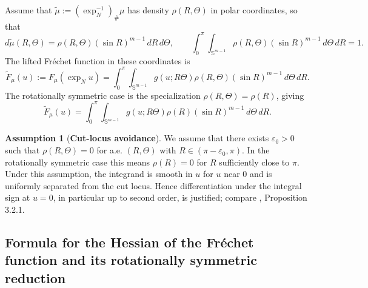 \documentclass{amsart}
\theoremstyle{definition}
\newtheorem{assumption}[theorem]{Assumption}
\theoremstyle{remark}
\newcommand\0{\boldsymbol{0}}
\begin{document}
Assume that \(\widetilde\mu:=(\exp_N^{-1})_\#\mu\) has density \(\rho(R,\Theta)\) in polar coordinates, so that
\begin{equation}
\label{eqn:general-density-polar}
    d\widetilde\mu(R,\Theta)=\rho(R,\Theta)(\sin R)^{m-1}\,dR\,d\Theta,
    \qquad
    \int_0^\pi\!\!\int_{\mathbb S^{m-1}}\rho(R,\Theta)(\sin R)^{m-1}\,d\Theta\,dR=1 .
\end{equation}
The lifted Fr\'echet function in these coordinates is
\begin{equation}\label{eqn:Frechet-general-polar}
    \widetilde F_\mu(u):=F_\mu(\exp_Nu)
    =
    \int_0^\pi\!\!\int_{\mathbb S^{m-1}}
    g(u;R\Theta)\rho(R,\Theta)(\sin R)^{m-1}\,d\Theta\,dR .
\end{equation}
The rotationally symmetric case is the specialization \(\rho(R,\Theta)=\rho(R)\), giving
\begin{equation}
\label{eqn:Fréchet-rot-symm-double-int}
    \widetilde F_\mu(u)
    =
    \int_0^\pi\!\!\int_{\mathbb S^{m-1}}
    g(u;R\Theta)\rho(R)(\sin R)^{m-1}\,d\Theta\,dR .
\end{equation}

\begin{assumption}[\textbf{Cut-locus avoidance}]
\label{assum:density-assumption}
We assume that there exists \(\varepsilon_0>0\) such that \(\rho(R,\Theta)=0\) for a.e. \((R,\Theta)\) with \(R\in(\pi-\varepsilon_0,\pi)\).  In the rotationally symmetric case this means \(\rho(R)=0\) for \(R\) sufficiently close to \(\pi\).  Under this assumption, the integrand is smooth in \(u\) for \(u\) near \(0\) and is uniformly separated from the cut locus. Hence differentiation under the integral sign at \(u=0\), in particular up to second order, is justified; compare \citet{tran2020sampling}, Proposition 3.2.1.
\end{assumption}

\subsection{Formula for the Hessian of the Fréchet function and its rotationally symmetric reduction}
\label{para:Hess-general-density}
\end{document}
